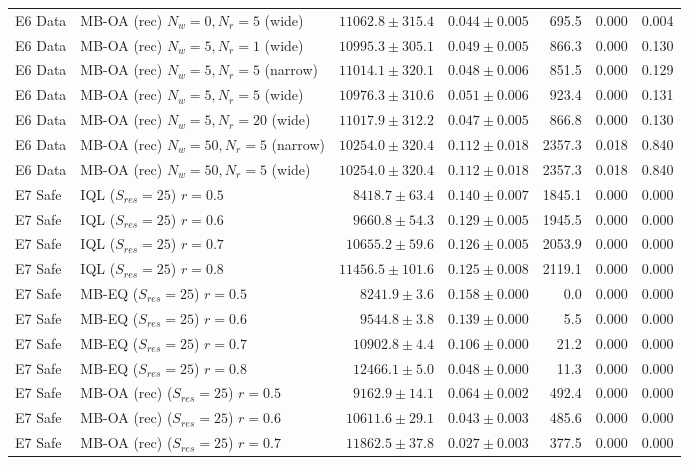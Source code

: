 \begin{tabular}{llrrrrr}
E6 Data & MB-OA (rec) $N_w=0, N_r=5$ (wide) & $11062.8 \pm 315.4$ & $0.044 \pm 0.005$ & 695.5 & 0.000 & 0.004 \\
E6 Data & MB-OA (rec) $N_w=5, N_r=1$ (wide) & $10995.3 \pm 305.1$ & $0.049 \pm 0.005$ & 866.3 & 0.000 & 0.130 \\
E6 Data & MB-OA (rec) $N_w=5, N_r=5$ (narrow) & $11014.1 \pm 320.1$ & $0.048 \pm 0.006$ & 851.5 & 0.000 & 0.129 \\
E6 Data & MB-OA (rec) $N_w=5, N_r=5$ (wide) & $10976.3 \pm 310.6$ & $0.051 \pm 0.006$ & 923.4 & 0.000 & 0.131 \\
E6 Data & MB-OA (rec) $N_w=5, N_r=20$ (wide) & $11017.9 \pm 312.2$ & $0.047 \pm 0.005$ & 866.8 & 0.000 & 0.130 \\
E6 Data & MB-OA (rec) $N_w=50, N_r=5$ (narrow) & $10254.0 \pm 320.4$ & $0.112 \pm 0.018$ & 2357.3 & 0.018 & 0.840 \\
E6 Data & MB-OA (rec) $N_w=50, N_r=5$ (wide) & $10254.0 \pm 320.4$ & $0.112 \pm 0.018$ & 2357.3 & 0.018 & 0.840 \\
\midrule
E7 Safe & IQL ($S_{res}=25$) $r=0.5$ & $8418.7 \pm 63.4$ & $0.140 \pm 0.007$ & 1845.1 & 0.000 & 0.000 \\
E7 Safe & IQL ($S_{res}=25$) $r=0.6$ & $9660.8 \pm 54.3$ & $0.129 \pm 0.005$ & 1945.5 & 0.000 & 0.000 \\
E7 Safe & IQL ($S_{res}=25$) $r=0.7$ & $10655.2 \pm 59.6$ & $0.126 \pm 0.005$ & 2053.9 & 0.000 & 0.000 \\
E7 Safe & IQL ($S_{res}=25$) $r=0.8$ & $11456.5 \pm 101.6$ & $0.125 \pm 0.008$ & 2119.1 & 0.000 & 0.000 \\
E7 Safe & MB-EQ ($S_{res}=25$) $r=0.5$ & $8241.9 \pm 3.6$ & $0.158 \pm 0.000$ & 0.0 & 0.000 & 0.000 \\
E7 Safe & MB-EQ ($S_{res}=25$) $r=0.6$ & $9544.8 \pm 3.8$ & $0.139 \pm 0.000$ & 5.5 & 0.000 & 0.000 \\
E7 Safe & MB-EQ ($S_{res}=25$) $r=0.7$ & $10902.8 \pm 4.4$ & $0.106 \pm 0.000$ & 21.2 & 0.000 & 0.000 \\
E7 Safe & MB-EQ ($S_{res}=25$) $r=0.8$ & $12466.1 \pm 5.0$ & $0.048 \pm 0.000$ & 11.3 & 0.000 & 0.000 \\
E7 Safe & MB-OA (rec) ($S_{res}=25$) $r=0.5$ & $9162.9 \pm 14.1$ & $0.064 \pm 0.002$ & 492.4 & 0.000 & 0.000 \\
E7 Safe & MB-OA (rec) ($S_{res}=25$) $r=0.6$ & $10611.6 \pm 29.1$ & $0.043 \pm 0.003$ & 485.6 & 0.000 & 0.000 \\
E7 Safe & MB-OA (rec) ($S_{res}=25$) $r=0.7$ & $11862.5 \pm 37.8$ & $0.027 \pm 0.003$ & 377.5 & 0.000 & 0.000 \\

\end{tabular}
